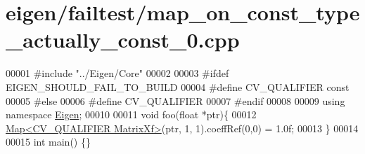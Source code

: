\hypertarget{eigen_2failtest_2map__on__const__type__actually__const__0_8cpp_source}{}\section{eigen/failtest/map\+\_\+on\+\_\+const\+\_\+type\+\_\+actually\+\_\+const\+\_\+0.cpp}
\label{eigen_2failtest_2map__on__const__type__actually__const__0_8cpp_source}

\begin{DoxyCode}
00001 \textcolor{preprocessor}{#include "../Eigen/Core"}
00002 
00003 \textcolor{preprocessor}{#ifdef EIGEN\_SHOULD\_FAIL\_TO\_BUILD}
00004 \textcolor{preprocessor}{#define CV\_QUALIFIER const}
00005 \textcolor{preprocessor}{#else}
00006 \textcolor{preprocessor}{#define CV\_QUALIFIER}
00007 \textcolor{preprocessor}{#endif}
00008 
00009 \textcolor{keyword}{using namespace }\hyperlink{namespace_eigen}{Eigen};
00010 
00011 \textcolor{keywordtype}{void} foo(\textcolor{keywordtype}{float} *ptr)\{
00012     \hyperlink{group___core___module_class_eigen_1_1_map}{Map<CV\_QUALIFIER MatrixXf>}(ptr, 1, 1).coeffRef(0,0) = 1.0f;
00013 \}
00014 
00015 \textcolor{keywordtype}{int} main() \{\}
\end{DoxyCode}

